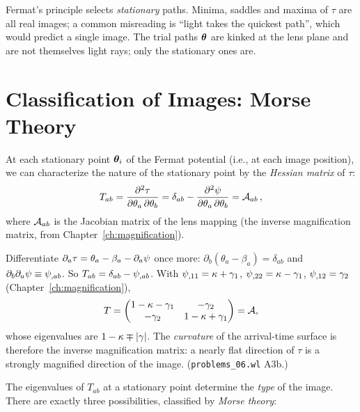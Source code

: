 \begin{annotation}
Fermat's principle selects \emph{stationary} paths.  Minima, saddles and
maxima of $\tau$ are all real images; a common misreading is ``light takes
the quickest path'', which would predict a single image.  The trial paths
$\boldsymbol{\theta}$ are kinked at the lens plane and are not themselves light rays;
only the stationary ones are.
\end{annotation}


\section{Classification of Images: Morse Theory}
\label{sec:morse_theory}

At each stationary point $\boldsymbol{\theta}_i$ of the Fermat potential (i.e.,
at each image position), we can characterize the nature of the
stationary point by the \emph{Hessian matrix} of $\tau$:
\begin{equation}
    T_{ab} = \frac{\partial^2 \tau}{\partial\theta_a\,\partial\theta_b}
    = \delta_{ab} - \frac{\partial^2\psi}{\partial\theta_a\,\partial\theta_b}
    = \mathcal{A}_{ab} \,,
    \label{eq:hessian_tau}
\end{equation}
where $\mathcal{A}_{ab}$ is the Jacobian matrix of the lens mapping
(the inverse magnification matrix, from
Chapter~\ref{ch:magnification}).

\begin{derivation}[Hessian of $\tau$ = Jacobian $\Amat$]
Differentiate $\partial_a\tau = \theta_a-\beta_a-\partial_a\psi$ once more:
$\partial_b(\theta_a-\beta_a) = \delta_{ab}$ and
$\partial_b\partial_a\psi \equiv \psi_{,ab}$.  So
$T_{ab} = \delta_{ab}-\psi_{,ab}$.  With
$\psi_{,11} = \kappa+\gamma_1$, $\psi_{,22} = \kappa-\gamma_1$,
$\psi_{,12} = \gamma_2$ (Chapter~\ref{ch:magnification}),
\[
  T = \begin{pmatrix} 1-\kappa-\gamma_1 & -\gamma_2\\ -\gamma_2 & 1-\kappa+\gamma_1\end{pmatrix}
  = \mathcal{A} ,
\]
whose eigenvalues are $1-\kappa\mp|\gamma|$.  The \emph{curvature} of the
arrival-time surface is therefore the inverse magnification matrix: a
nearly flat direction of $\tau$ is a strongly magnified direction of the
image.  (\texttt{problems\_06.wl} A3b.)
\end{derivation}

The eigenvalues of $T_{ab}$ at a stationary point determine the
\textit{type} of the image.  There are exactly three possibilities,
classified by \emph{Morse theory}:

